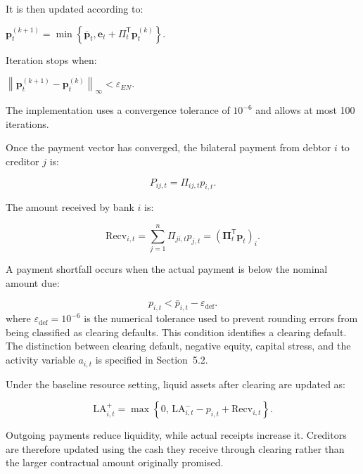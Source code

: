It is then updated according to:

\(\mathbf{p}_{t}^{(k + 1)} = \min\left\{ {\overline{\mathbf{p}}}_{t},\mathbf{e}_{t} + \Pi_{t}^{\mathsf{T}}\mathbf{p}_{t}^{(k)} \right\}\).

Iteration stops when:

\(\left\| \mathbf{p}_{t}^{(k + 1)} - \mathbf{p}_{t}^{(k)} \right\|_{\infty} < \varepsilon_{EN}\).

The implementation uses a convergence tolerance of \(10^{- 6}\) and
allows at most 100 iterations.

Once the payment vector has converged, the bilateral payment from debtor
\(i\) to creditor \(j\) is:


\begin{equation}
P_{ij,t}=\Pi_{ij,t}p_{i,t}\label{eq:bilateral-payment}.
\end{equation}


The amount received by bank \(i\) is:


\begin{equation}
\mathrm{Recv}_{i,t}=\sum_{j=1}^{n}\Pi_{ji,t}p_{j,t}=\left(\boldsymbol\Pi_t^{\mathsf T}\mathbf p_t\right)_i\label{eq:received-payment}.
\end{equation}


A payment shortfall occurs when the actual payment is below the nominal
amount due:


\begin{equation}
p_{i,t}<\bar p_{i,t}-\varepsilon_{\mathrm{def}}\label{eq:clearing-default}.
\end{equation}
\vspace{-0.4\baselineskip}
\noindent where \(\varepsilon_{\mathrm{def}} = 10^{-6}\) is the numerical tolerance used to
prevent rounding errors from being classified as clearing defaults. This
condition identifies a clearing default. The distinction between
clearing default, negative equity, capital stress, and the activity
variable \(a_{i,t}\) is specified in Section~5.2.

Under the baseline resource setting, liquid assets after clearing are
updated as:


\begin{equation}
\mathrm{LA}_{i,t}^{+}=\max\left\{0,\,\mathrm{LA}_{i,t}^{-}-p_{i,t}+\mathrm{Recv}_{i,t}\right\}\label{eq:liquidity-update}.
\end{equation}


Outgoing payments reduce liquidity, while actual receipts increase it.
Creditors are therefore updated using the cash they receive through
clearing rather than the larger contractual amount originally promised.

